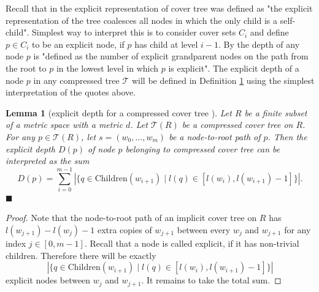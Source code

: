 \documentclass[a4paper,UKenglish,cleveref, autoref]{lipics-v2019}
\numberwithin{algocf}{section}
\theoremstyle{definition}
\theoremstyle{definition}
\theoremstyle{definition}
\theoremstyle{plain}
\newtheorem{lem}[algocf]{Lemma}
\newcommand{\Child}{\mathrm{Children}}
\newcommand{\T}{\mathcal{T}}
\newcommand{\bs}{\hfill $\blacksquare$}
\begin{document}
Recall that in \cite[Section~2]{beygelzimer2006cover} the explicit representation of cover tree was defined as 
"the explicit representation of the tree coalesces all nodes in which the only child is a self-child". Simplest way to interpret this is to consider cover sets $C_i$ and define $p \in C_i$ to be an explicit node, if $p$ has child at level $i-1$.  
By \cite[Lemma~4.3]{beygelzimer2006cover} the depth of any node $p$ is "defined as the number of explicit grandparent nodes on the path from the root to $p$ in the lowest level in which $p$ is explicit". 
The explicit depth of a node $p$ in any compressed tree $\T$ will be defined in Definition \ref{dfn:explicit_depth_for_compressed_cover_tree} using the simplest interpretation of the quotes above.

\begin{lem}[explicit depth for a compressed cover tree {\cite[Lemma~3.2]{elkin2021new}}]
\label{dfn:explicit_depth_for_compressed_cover_tree}
Let $R$ be a finite subset of a metric space with a metric $d$.
Let $\T(R)$ be a compressed cover tree on $R$. 
For any $p \in \T(R)$, let $s = (w_0, ... , w_m)$ be a node-to-root path of $p$. 
Then the explicit depth $D(p)$ of node $p$ belonging to compressed cover tree can be interpreted as the sum 
$$D(p) = \sum^{m-1}_{i = 0}| \{q \in \Child(w_{i+1}) \mid l(q) \in [l(w_i), l(w_{i+1}) - 1] \} |. $$
\bs
\end{lem}
\begin{proof}
Note that the node-to-root path of an implicit cover tree on $R$ has $l(w_{j+1}) - l(w_{j}) - 1$ extra copies of $w_{j+1}$ between every $w_{j}$ and $w_{j+1}$ for any index $j \in [0,m-1]$. Recall that a node is called explicit, if it has non-trivial children. 
Therefore there will be exactly $$| \{q \in \Child(w_{i+1}) \mid l(q) \in [l(w_i), l(w_{i+1}) - 1] \} | $$ 
explicit nodes between $w_{j}$ and $w_{j+1}$.
It remains to take the total sum.
\end{proof}
\end{document}
